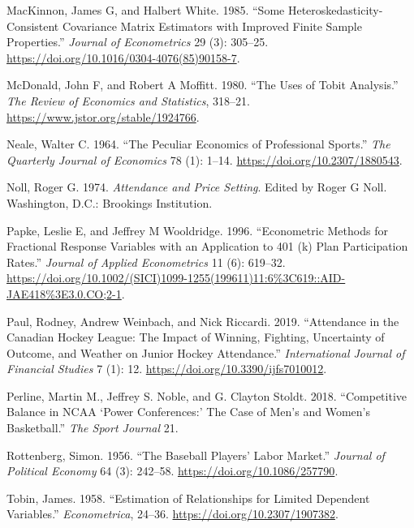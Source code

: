 \documentclass[
  letterpaper,
  DIV=11,
  numbers=noendperiod]{scrartcl}
\newlength{\cslhangindent}
\newenvironment{CSLReferences}[2] %
 {\begin{list}{}{%
  \setlength{\itemindent}{0pt}
  \setlength{\leftmargin}{0pt}
  \setlength{\parsep}{0pt}
  \ifodd #1
   \setlength{\leftmargin}{\cslhangindent}
   \setlength{\itemindent}{-1\cslhangindent}
  \fi
  \setlength{\itemsep}{#2\baselineskip}}}
 {\end{list}}
\begin{document}
\begin{CSLReferences}{1}{1}
MacKinnon, James G, and Halbert White. 1985. {``Some
Heteroskedasticity-Consistent Covariance Matrix Estimators with Improved
Finite Sample Properties.''} \emph{Journal of Econometrics} 29 (3):
305--25. \url{https://doi.org/10.1016/0304-4076(85)90158-7}.

McDonald, John F, and Robert A Moffitt. 1980. {``The Uses of {Tobit}
Analysis.''} \emph{The Review of Economics and Statistics}, 318--21.
\url{https://www.jstor.org/stable/1924766}.

Neale, Walter C. 1964. {``The Peculiar Economics of Professional
Sports.''} \emph{The Quarterly Journal of Economics} 78 (1): 1--14.
\url{https://doi.org/10.2307/1880543}.

Noll, Roger G. 1974. \emph{Attendance and Price Setting}. Edited by
Roger G Noll. Washington, D.C.: Brookings Institution.

Papke, Leslie E, and Jeffrey M Wooldridge. 1996. {``Econometric Methods
for Fractional Response Variables with an Application to 401 (k) Plan
Participation Rates.''} \emph{Journal of Applied Econometrics} 11 (6):
619--32.
\url{https://doi.org/10.1002/(SICI)1099-1255(199611)11:6\%3C619::AID-JAE418\%3E3.0.CO;2-1}.

Paul, Rodney, Andrew Weinbach, and Nick Riccardi. 2019. {``Attendance in
the Canadian Hockey League: The Impact of Winning, Fighting, Uncertainty
of Outcome, and Weather on Junior Hockey Attendance.''}
\emph{International Journal of Financial Studies} 7 (1): 12.
\url{https://doi.org/10.3390/ijfs7010012}.

Perline, Martin M., Jeffrey S. Noble, and G. Clayton Stoldt. 2018.
{``Competitive Balance in NCAA {`Power Conferences:'} The Case of Men's
and Women's Basketball.''} \emph{The Sport Journal} 21.

Rottenberg, Simon. 1956. {``The Baseball Players' Labor Market.''}
\emph{Journal of Political Economy} 64 (3): 242--58.
\url{https://doi.org/10.1086/257790}.

Tobin, James. 1958. {``Estimation of Relationships for Limited Dependent
Variables.''} \emph{Econometrica}, 24--36.
\url{https://doi.org/10.2307/1907382}.


\end{CSLReferences}
\end{document}
